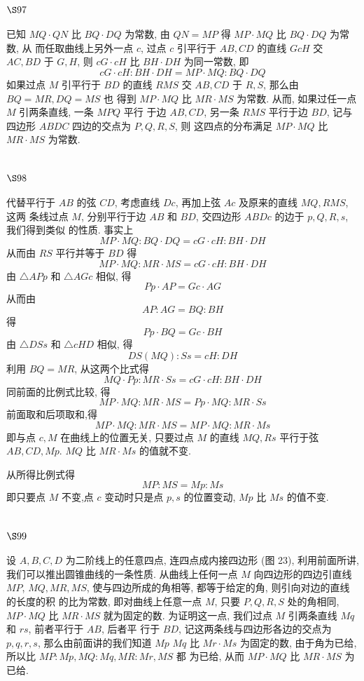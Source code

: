 \section{$\S 97$}

已知 $M Q \cdot Q N$ 比 $B Q \cdot D Q$ 为常数, 由 $Q N=M P$ 得 $M P \cdot M Q$ 比 $B Q \cdot D Q$ 为常数, 从 而任取曲线上另外一点 $c$, 过点 $c$ 引平行于 $A B, C D$ 的直线 $G c H$ 交 $A C, B D$ 于 $G, H$, 则 $c G \cdot c H$ 比 $B H \cdot D H$ 为同一常数, 即
\[
c G \cdot c H: B H \cdot D H=M P \cdot M Q: B Q \cdot D Q
\]
如果过点 $M$ 引平行于 $B D$ 的直线 $R M S$ 交 $A B, C D$ 于 $R, S$, 那么由 $B Q=M R, D Q=M S$ 也 得到 $M P \cdot M Q$ 比 $M R \cdot M S$ 为常数. 从而, 如果过任一点 $M$ 引两条直线, 一条 $M P Q$ 平行 于边 $A B, C D$, 另一条 $R M S$ 平行于边 $B D$, 记与四边形 $A B D C$ 四边的交点为 $P, Q, R, S$, 则 这四点的分布满足 $M P \cdot M Q$ 比 $M R \cdot M S$ 为常数.

\section{$\S 98$}

代替平行于 $A B$ 的弦 $C D$, 考虑直线 $D c$, 再加上弦 $A c$ 及原来的直线 $M Q, R M S$, 这两 条线过点 $M$, 分别平行于边 $A B$ 和 $B D$, 交四边形 $A B D c$ 的边于 $p, Q, R, s$, 我们得到类似 的性质. 事实上
\[
M P \cdot M Q: B Q \cdot D Q=c G \cdot c H: B H \cdot D H
\]
从而由 $R S$ 平行并等于 $B D$ 得
\[
M P \cdot M Q: M R \cdot M S=c G \cdot c H: B H \cdot D H
\]
由 $\triangle A P p$ 和 $\triangle A G c$ 相似, 得
\[
P p \cdot A P=G c \cdot A G
\]
从而由
\[
A P: A G=B Q: B H
\]
得
\[
P p \cdot B Q=G c \cdot B H
\]
由 $\triangle D S s$ 和 $\triangle c H D$ 相似, 得
\[
D S(M Q): S s=c H: D H
\]
利用 $B Q=M R$, 从这两个比式得
\[
M Q \cdot P p: M R \cdot S s=c G \cdot c H: B H \cdot D H
\]
同前面的比例式比较, 得
\[
M P \cdot M Q: M R \cdot M S=P p \cdot M Q: M R \cdot S s
\]
前面取和后项取和,得
\[
M P \cdot M Q: M R \cdot M S=M P \cdot M Q: M R \cdot M s
\]
即与点 $c, M$ 在曲线上的位置无关, 只要过点 $M$ 的直线 $M Q, R s$ 平行于弦 $A B, C D, M p$. $M Q$ 比 $M R \cdot M s$ 的值就不变.

从所得比例式得
\[
M P: M S=M p: M s
\]
即只要点 $M$ 不变,点 $c$ 变动时只是点 $p, s$ 的位置变动, $M p$ 比 $M s$ 的值不变.

\section{$\S 99$}

设 $A, B, C, D$ 为二阶线上的任意四点, 连四点成内接四边形 (图 23), 利用前面所讲, 我们可以推出圆锥曲线的一条性质. 从曲线上任何一点 $M$ 向四边形的四边引直线 $M P$, $M Q, M R, M S$, 使与四边所成的角相等, 都等于给定的角, 则引向对边的直线的长度的积 的比为常数, 即对曲线上任意一点 $M$, 只要 $P, Q, R, S$ 处的角相同, $M P \cdot M Q$ 比 $M R \cdot M S$ 就为固定的数. 为证明这一点, 我们过点 $M$ 引两条直线 $M q$ 和 $r s$, 前者平行于 $A B$, 后者平 行于 $B D$, 记这两条线与四边形各边的交点为 $p, q, r, s$, 那么由前面讲的我们知道 $M p$ $M q$ 比 $M r \cdot M s$ 为固定的数, 由于角为已给, 所以比 $M P: M p, M Q: M q, M R: M r, M S$ 都 为已给, 从而 $M P \cdot M Q$ 比 $M R \cdot M S$ 为已给.

